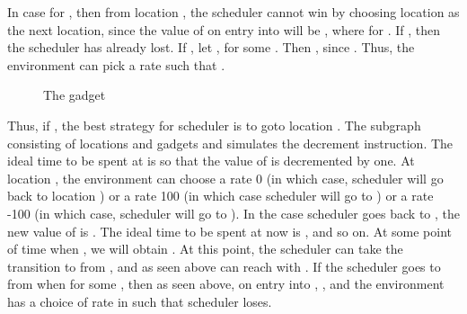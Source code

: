 \begin{enumerate}
In case  for , then from location , 
the scheduler cannot win by choosing location  as the next location, 
since the value of  on entry into  will be 
, where  for . 
If , then the scheduler has already lost. If 
, let , for some .
Then , since .
Thus, the environment can pick a rate  
such that . 
  

\begin{figure}[h]
\begin{center}
\caption{The gadget }
\label{z}
\end{center}
\end{figure}

Thus, if , the best strategy for scheduler is to goto
location . The subgraph consisting of locations  and gadgets  and 
 simulates the decrement  instruction. The ideal time to be spent 
at  is  so that the value of  is decremented by one. At location ,
the environment can choose a rate 0 (in which case, scheduler will go back to location )
or a rate 100 (in which case scheduler will go to ) or a rate -100 (in which case, 
scheduler will go to ). In the case scheduler goes back to , 
the new value of  is . The ideal time to be spent at  now is 
, and so on. At some point of time when , we will obtain . 
At this point, the scheduler can take the transition to  from , and as
seen above can reach  with . If the scheduler 
goes to  from  when  for some , then 
as seen above, on entry into , , and the environment has a 
choice of rate in  such that scheduler loses. 



\end{enumerate}
